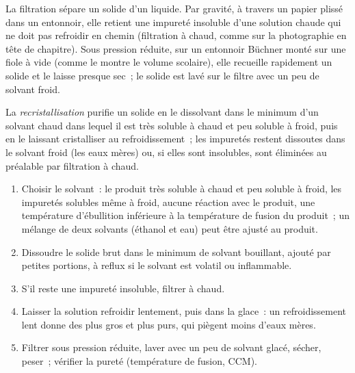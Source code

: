 La filtration sépare un solide d'un liquide. Par gravité, à travers un
papier plissé dans un entonnoir, elle retient une impureté insoluble
d'une solution chaude qui ne doit pas refroidir en chemin (filtration à
chaud, comme sur la photographie en tête de chapitre). Sous pression
réduite, sur un entonnoir Büchner monté sur une fiole à vide (comme le
montre le volume scolaire), elle recueille rapidement un solide et le
laisse presque sec~; le solide est lavé sur le filtre avec un peu de
solvant froid.

\begin{definition}[Recristallisation]\label{def:b1:lab-techniques-1:recrystallisation}
La \emph{recristallisation} purifie un solide
en le dissolvant dans le minimum d'un solvant chaud dans lequel il est
très soluble à chaud et peu soluble à froid, puis en le laissant
cristalliser au refroidissement~; les impuretés restent dissoutes dans
le solvant froid (les eaux mères) ou, si elles sont insolubles, sont
éliminées au préalable par filtration à chaud.
\end{definition}

\begin{method}\label{met:b1:lab-techniques-1:recrystallise}
\begin{enumerate}
  \item Choisir le solvant~: le produit très soluble à chaud et peu
        soluble à froid, les impuretés solubles même à froid, aucune
        réaction avec le produit, une température d'ébullition inférieure
        à la température de fusion du produit~; un mélange de deux
        solvants  (éthanol et eau) peut être ajusté au produit.
  \item Dissoudre le solide brut dans le minimum de solvant bouillant,
        ajouté par petites portions, à reflux si le solvant est volatil ou
        inflammable.
  \item S'il reste une impureté insoluble, filtrer à chaud.
  \item Laisser la solution refroidir lentement, puis dans la glace~: un
        refroidissement lent donne des  plus gros et plus purs,
        qui piègent moins d'eaux mères.
  \item Filtrer sous pression réduite, laver avec un peu de solvant
        glacé, sécher, peser~; vérifier la pureté (température de fusion,
        CCM).
\end{enumerate}
\end{method}

